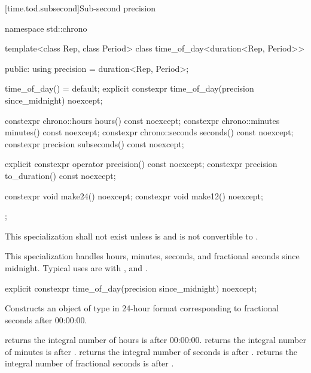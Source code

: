 [time.tod.subsecond]{Sub-second precision}

\begin{codeblock}
namespace std::chrono {
  template<class Rep, class Period>
  class time_of_day<duration<Rep, Period>> {
  public:
    using precision = duration<Rep, Period>;

    time_of_day() = default;
    explicit constexpr time_of_day(precision since_midnight) noexcept;

    constexpr chrono::hours     hours()      const noexcept;
    constexpr chrono::minutes   minutes()    const noexcept;
    constexpr chrono::seconds   seconds()    const noexcept;
    constexpr precision subseconds() const noexcept;

    explicit constexpr operator  precision()   const noexcept;
    constexpr          precision to_duration() const noexcept;

    constexpr void make24() noexcept;
    constexpr void make12() noexcept;
  };
}
\end{codeblock}

\pnum
This specialization shall not exist unless
 is 
and
 is not convertible to .
\begin{note}
This specialization handles hours, minutes, seconds, and fractional seconds since midnight.
Typical uses are with ,  and .
\end{note}

%
\begin{itemdecl}
explicit constexpr time_of_day(precision since_midnight) noexcept;
\end{itemdecl}

\begin{itemdescr}
\pnum
\effects
Constructs an object of type 
in 24-hour format
corresponding to  fractional seconds after 00:00:00.

\pnum
\postconditions
{} returns the integral number of hours
 is after 00:00:00.
 returns the integral number of minutes
is after .
 returns the integral number of seconds
is after .
 returns the integral number of fractional seconds
 is after .
\end{itemdescr}

